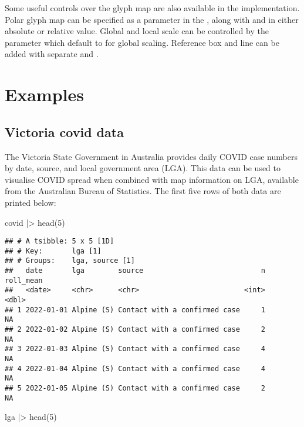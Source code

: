 \documentclass{article}
\newenvironment{Shaded}{\begin{snugshade}}{\end{snugshade}}
\newcommand{\DecValTok}[1]{\textcolor[rgb]{0.00,0.00,0.81}{#1}}
\newcommand{\FunctionTok}[1]{\textcolor[rgb]{0.00,0.00,0.00}{#1}}
\newcommand{\NormalTok}[1]{#1}
\newcommand{\SpecialCharTok}[1]{\textcolor[rgb]{0.00,0.00,0.00}{#1}}
\begin{document}
Some useful controls over the glyph map are also available in the  implementation. Polar glyph map can be specified as a parameter  in the , along with  and  in either absolute or relative value. Global and local scale can be controlled by the parameter  which default to  for global scaling. Reference box and line can be added with separate  and .

\hypertarget{examples}{%
\section{Examples}\label{examples}}

\hypertarget{covid}{%
\subsection{Victoria covid data}\label{covid}}

The Victoria State Government in Australia provides daily COVID case numbers by date, source, and local government area (LGA). This data can be used to visualise COVID spread when combined with map information on LGA, available from the Australian Bureau of Statistics. The first five rows of both data are printed below:

\begin{Shaded}
\begin{Highlighting}[]
\NormalTok{covid }\SpecialCharTok{|\textgreater{}} \FunctionTok{head}\NormalTok{(}\DecValTok{5}\NormalTok{)}
\end{Highlighting}
\end{Shaded}

\begin{verbatim}
## # A tsibble: 5 x 5 [1D]
## # Key:       lga [1]
## # Groups:    lga, source [1]
##   date       lga        source                            n roll_mean
##   <date>     <chr>      <chr>                         <int>     <dbl>
## 1 2022-01-01 Alpine (S) Contact with a confirmed case     1        NA
## 2 2022-01-02 Alpine (S) Contact with a confirmed case     2        NA
## 3 2022-01-03 Alpine (S) Contact with a confirmed case     4        NA
## 4 2022-01-04 Alpine (S) Contact with a confirmed case     4        NA
## 5 2022-01-05 Alpine (S) Contact with a confirmed case     2        NA
\end{verbatim}

\begin{Shaded}
\begin{Highlighting}[]
\NormalTok{lga }\SpecialCharTok{|\textgreater{}} \FunctionTok{head}\NormalTok{(}\DecValTok{5}\NormalTok{)}
\end{Highlighting}
\end{Shaded}
\end{document}
